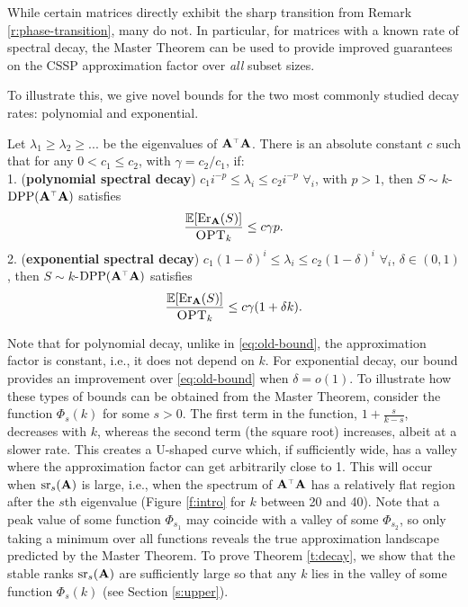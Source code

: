\documentclass{article}
\begin{document}
While certain matrices directly exhibit the sharp transition from
Remark \ref{r:phase-transition}, many do not. In particular, for
matrices with a known rate of spectral decay, the Master Theorem can
be used to provide improved guarantees on the CSSP approximation
factor over \emph{all} subset sizes. 

To illustrate this, we give novel bounds
for the two most commonly studied decay rates:  polynomial and exponential.
\begin{theorem}\label{t:decay}
Let $\lambda_1\!\geq\!\lambda_2\!\geq\!...$ be the
eigenvalues of $\A^\top\A$. There is an absolute constant $c$ such that
for any $0\!<\!c_1\!\leq\!c_2$, with $\gamma=c_2/c_1$, if:\\[2mm]
\textnormal{1.} (\textbf{polynomial spectral decay}) $c_1i^{-p}\!\leq\!
  \lambda_i\!\leq\! c_2i^{-p}$ $\forall_i$, with $p>1$, then $S\sim
k$-$\DPP(\A^\top\A)$ satisfies
  \begin{align*}
    \frac{\mathbb E[\mathrm{Er}_\mathbf A(S)]}{{\textsc{OPT}_k}}\leq c \gamma p. 
  \end{align*}
\textnormal{2.} (\textbf{exponential spectral decay}) $c_1(1\!-\!\delta)^{i}\leq \lambda_i\leq
  c_2(1\!-\!\delta)^{i}$ $\forall_i$, $\delta\in(0,1)$, then $S\sim
k$-$\DPP(\A^\top\A)$ satisfies %
  \begin{align*}
    \frac{\mathbb E[\mathrm{Er}_\mathbf A(S)]}{{\textsc{OPT}_k}}\leq c\gamma(1+ \delta k).
  \end{align*}
\end{theorem}
Note that for polynomial decay, unlike in \eqref{eq:old-bound}, the
approximation factor is constant, i.e., it does not depend on $k$. For
exponential decay, our bound provides an improvement over
\eqref{eq:old-bound} when $\delta=o(1)$.
To illustrate how these types of bounds can be obtained from the
Master Theorem, consider the function $\Phi_s(k)$ for some
$s>0$. The first term in the function, $1+\frac{s}{k-s}$, decreases with $k$, whereas
the second term (the square root) increases, albeit at a slower rate. This creates a
U-shaped curve which, if sufficiently wide, has a valley where the
approximation factor can get arbitrarily close to 1. This will occur
when ${\mathrm{sr}}_s(\mathbf A)$ is large, i.e., when the spectrum of $\A^\top\A$ has
a relatively flat region after the $s$th eigenvalue (Figure \ref{f:intro}
for $k$ between 20 and 40). Note that a peak value of some function
$\Phi_{s_1}$ may coincide with a valley of some $\Phi_{s_2}$, so only
taking a minimum over all functions reveals the true approximation
landscape predicted by the Master Theorem. To prove Theorem
\ref{t:decay}, we show that the stable ranks ${\mathrm{sr}}_s(\mathbf A)$ are
sufficiently large so that any $k$ lies in  the valley of some
function $\Phi_s(k)$ (see Section \ref{s:upper}).
\end{document}
